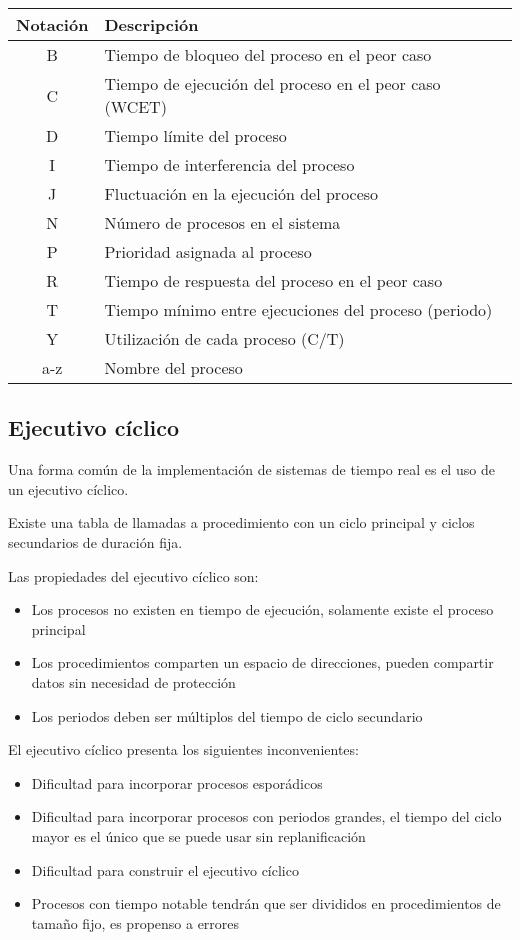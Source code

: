 \begin{tabular}{|c|l|}
	\hline 
	Notación & Descripción \\ 
	\hline 
	B &  Tiempo de bloqueo del proceso en el peor caso \\ 
	\hline 
	C &  Tiempo de ejecución del proceso en el peor caso (WCET) \\ 
	\hline
	D &  Tiempo límite del proceso \\
	\hline
	I &  Tiempo de interferencia del proceso \\
	\hline
	J &  Fluctuación en la ejecución del proceso \\
	\hline
	N &  Número de procesos en el sistema \\
	\hline
	P &  Prioridad asignada al proceso \\
	\hline
	R &  Tiempo de respuesta del proceso en el peor caso \\
	\hline
	T &  Tiempo mínimo entre ejecuciones del proceso (periodo) \\
	\hline
	Y &  Utilización de cada proceso (C/T) \\
	\hline
	a-z &  Nombre del proceso \\
	\hline
\end{tabular} 


\subsection{Ejecutivo cíclico}

Una forma común de la implementación de sistemas de tiempo real es el uso de un
ejecutivo cíclico.

Existe una tabla de llamadas a procedimiento con un ciclo principal y ciclos
secundarios de duración fija.

Las propiedades del ejecutivo cíclico son:

\begin{itemize}
	\item Los procesos no existen en tiempo de ejecución, solamente existe
		el proceso principal
	\item Los procedimientos comparten un espacio de direcciones, pueden
		compartir datos sin necesidad de protección
	\item Los periodos deben ser múltiplos del tiempo de ciclo secundario
\end{itemize}

El ejecutivo cíclico presenta los siguientes inconvenientes:

\begin{itemize}
	\item Dificultad para incorporar procesos esporádicos
	\item Dificultad para incorporar procesos con periodos grandes, el
		tiempo del ciclo mayor es el único que se puede usar sin
		replanificación
	\item Dificultad para construir el ejecutivo cíclico
	\item Procesos con tiempo notable tendrán que ser divididos en
		procedimientos de tamaño fijo, es propenso a errores
\end{itemize}
